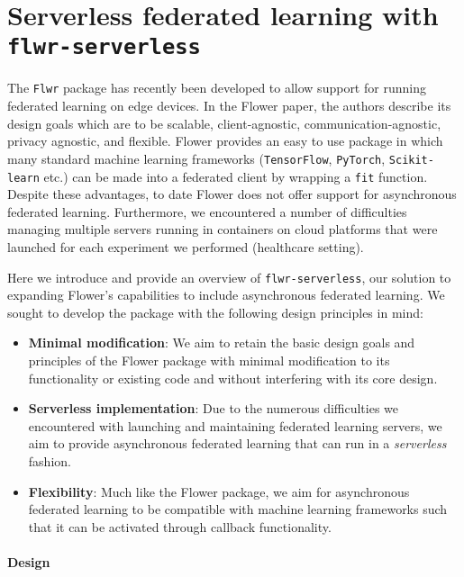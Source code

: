\documentclass[twocolumn, switch]{article} %
\begin{document}
\section{Serverless federated learning with \texttt{flwr-serverless}}

The \texttt{Flwr} package \cite{flower} has recently been developed to allow support for running federated learning on edge devices. In the Flower paper, the authors describe its design goals which are to be scalable, client-agnostic, communication-agnostic, privacy agnostic, and flexible. Flower provides an easy to use package in which many standard machine learning frameworks (\texttt{TensorFlow}, \texttt{PyTorch}, \texttt{Scikit-learn} etc.) can be made into a federated client by wrapping a \texttt{fit} function. Despite these advantages, to date Flower does not offer support for asynchronous federated learning. Furthermore, we encountered a number of difficulties managing multiple servers running in containers on cloud platforms that were launched for each experiment we performed (healthcare setting).

Here we introduce and provide an overview of \texttt{flwr-serverless}, our solution to expanding Flower's capabilities to include asynchronous federated learning. We sought to develop the package with the following design principles in mind:

\begin{itemize}
    \item \textbf{Minimal modification}: We aim to retain the basic design goals and principles of the Flower package with minimal modification to its functionality or existing code and without interfering with its core design.
    \item \textbf{Serverless implementation}: Due to the numerous difficulties we encountered with launching and maintaining federated learning servers, we aim to provide asynchronous federated learning that can run in a \textit{serverless} fashion.
    \item \textbf{Flexibility}: Much like the Flower package, we aim for asynchronous federated learning to be compatible with machine learning frameworks such that it can be activated through callback functionality.
\end{itemize}

\paragraph{Design}
\end{document}
